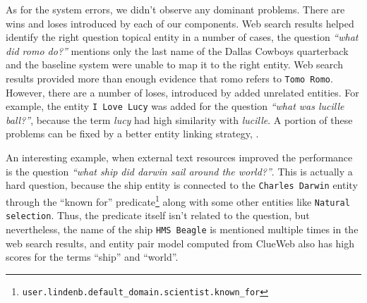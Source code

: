 As for the system errors, we didn't observe any dominant problems.
There are wins and loses introduced by each of our components.
Web search results helped identify the right question topical entity in a number of cases, \eg the question \textit{``what did romo do?''} mentions only the last name of the Dallas Cowboys quarterback and the baseline system were unable to map it to the right entity.
Web search results provided more than enough evidence that romo refers to \texttt{Tomo Romo}.
However, there are a number of loses, introduced by added unrelated entities.
For example, the entity \texttt{I Love Lucy} was added for the question \textit{``what was lucille ball?''}, because the term \textit{lucy} had high similarity with \textit{lucille}.
A portion of these problems can be fixed by a better entity linking strategy, \eg \cite{SMAPH_ERD:2014}.


An interesting example, when external text resources improved the performance is the question \textit{``what ship did darwin sail around the world?''}.
This is actually a hard question, because the ship entity is connected to the \texttt{Charles Darwin} entity through the ``known for'' predicate\footnote{\texttt{user.lindenb.default\_domain.scientist.known\_for}} along with some other entities like \texttt{Natural selection}.
Thus, the predicate itself isn't related to the question, but nevertheless, the name of the ship \texttt{HMS Beagle} is mentioned multiple times in the web search results, and entity pair model computed from ClueWeb also has high scores for the terms ``ship'' and ``world''.

